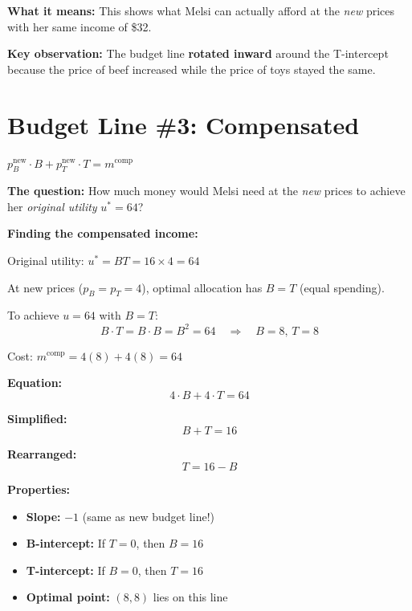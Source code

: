 \documentclass[12pt]{article}
\begin{document}
\vspace{1em}

\textbf{What it means:} This shows what Melsi can actually afford at the \textit{new} prices with her same income of \$32.

\vspace{1em}

\textbf{Key observation:} The budget line \textbf{rotated inward} around the T-intercept because the price of beef increased while the price of toys stayed the same.

\section*{Budget Line \#3: Compensated}

\begin{center}
\colorbox{green!20}{
\Large
$p_B^{\text{new}} \cdot B + p_T^{\text{new}} \cdot T = m^{\text{comp}}$
}
\end{center}

\textbf{The question:} How much money would Melsi need at the \textit{new} prices to achieve her \textit{original utility} $u^* = 64$?

\textbf{Finding the compensated income:}

Original utility: $u^* = BT = 16 \times 4 = 64$

At new prices ($p_B = p_T = 4$), optimal allocation has $B = T$ (equal spending).

To achieve $u = 64$ with $B = T$:
$$B \cdot T = B \cdot B = B^2 = 64 \quad \Rightarrow \quad B = 8, \, T = 8$$

Cost: $m^{\text{comp}} = 4(8) + 4(8) = 64$

\newpage

\textbf{Equation:}
$$4 \cdot B + 4 \cdot T = 64$$

\textbf{Simplified:}
$$B + T = 16$$

\textbf{Rearranged:}
$$T = 16 - B$$

\textbf{Properties:}
\begin{itemize}
    \item \textbf{Slope:} $-1$ (same as new budget line!)
    \item \textbf{B-intercept:} If $T=0$, then $B = 16$
    \item \textbf{T-intercept:} If $B=0$, then $T = 16$
    \item \textbf{Optimal point:} $(8, 8)$ lies on this line
\end{itemize}
\end{document}
